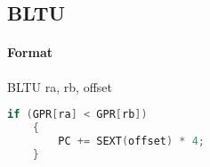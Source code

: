 \subsection{BLTU}


\paragraph{Format} BLTU ra, rb, offset

\begin{lstlisting}[language=c]
    if (GPR[ra] < GPR[rb])
    {
        PC += SEXT(offset) * 4;
    }
\end{lstlisting}
